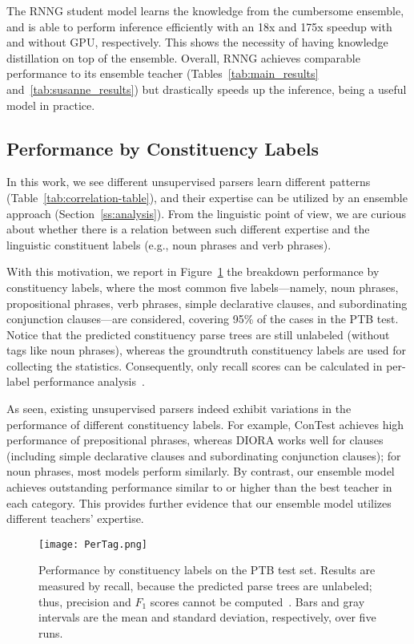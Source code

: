 \documentclass{article}
\begin{document}
The RNNG student model learns the knowledge from the cumbersome ensemble, and is able to perform inference efficiently with an 18x and 175x speedup with and without GPU, respectively. This shows the necessity of having knowledge distillation on top of the ensemble. Overall, RNNG achieves comparable performance to its ensemble teacher (Tables~\ref{tab:main_results} and~\ref{tab:susanne_results}) but drastically speeds up the inference, being a useful model in practice.


\subsection{Performance by Constituency Labels}\label{app:breakdown}


In this work, we see different unsupervised parsers learn different patterns (Table~\ref{tab:correlation-table}), and their expertise can be utilized by an ensemble approach (Section~\ref{ss:analysis}). From the linguistic point of view, we are curious about whether there is a relation between such different expertise and the linguistic constituent labels (e.g., noun phrases and verb phrases). 

With this motivation, we report in Figure~\ref{fig:pertag} the breakdown performance by constituency labels, where the most common five labels---namely, noun phrases, propositional phrases, verb phrases, simple declarative clauses, and subordinating conjunction clauses---are considered, covering 95\% of the cases in the PTB test. Notice that the predicted constituency parse trees are still unlabeled (without tags like noun phrases), whereas the groundtruth constituency labels are used for collecting the statistics. Consequently, only recall scores can be calculated in per-label performance analysis~\citep{drozdov-etal-2019-unsupervised-latent,kim-etal-2019-compound,cao-etal-2020-unsupervised}. 

As seen, existing unsupervised parsers indeed exhibit variations in the performance of different constituency labels. For example, ConTest achieves high performance of prepositional phrases, whereas DIORA works well for clauses (including simple declarative clauses and subordinating conjunction clauses); for noun phrases, most models perform similarly. By contrast, our ensemble model achieves outstanding performance similar to or higher than the best teacher in each category. This provides further evidence that our ensemble model utilizes different teachers' expertise. 

\begin{figure}[t]
\begin{center}
\texttt{[image: PerTag.png]}
\end{center}\vspace{-10pt}
\caption{Performance by constituency labels on the PTB test set. Results are measured by recall, because the predicted parse trees are unlabeled; thus, precision and $F_1$ scores cannot be computed~\citep{drozdov-etal-2019-unsupervised-latent}. Bars and gray intervals are the mean and standard deviation, respectively, over five runs.}
\label{fig:pertag}
\end{figure}
\end{document}
